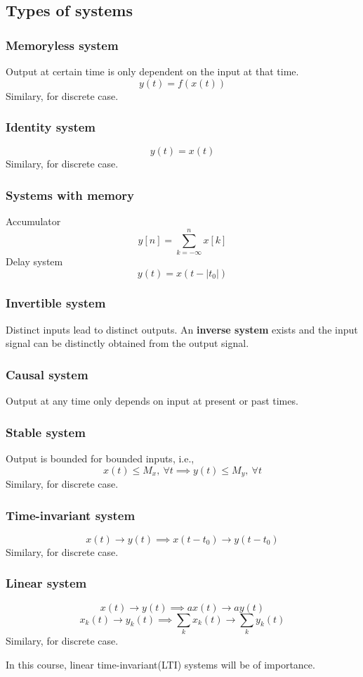 \documentclass[10pt, a4paper]{extarticle}
\theoremstyle{definition}
\begin{document}
\subsection{Types of systems}
\subsubsection{Memoryless system}
Output at certain time is only dependent on the input at that time.
\[y(t)=f(x(t))\]
Similary, for discrete case.
\subsubsection{Identity system}
\[y(t)=x(t)\]
Similary, for discrete case.
\subsubsection{Systems with memory}
Accumulator\[y[n]=\sum_{k=-\infty}^nx[k]\]
Delay system \[y(t)=x(t-|t_0|)\]
\subsubsection{Invertible system}
Distinct inputs lead to distinct outputs. An \textbf{inverse system} exists and the input signal can be distinctly obtained from the output signal.
\subsubsection{Causal system}
Output at any time only depends on input at present or past times.
\subsubsection{Stable system}
Output is bounded for bounded inputs, i.e.,\[x(t)\leq M_x,\ \forall t\implies y(t)\leq M_y,\ \forall t\]
Similary, for discrete case.
\subsubsection{Time-invariant system}
\[x(t)\to y(t)\implies x(t-t_0)\to y(t-t_0)\]
Similary, for discrete case.
\subsubsection{Linear system}
\[x(t)\to y(t)\implies ax(t)\to ay(t)\tag*{(Homogeneity)}\]
\[x_k(t)\to y_k(t)\implies \sum_k x_k(t)\to\sum_k y_k(t)\tag*{(Additivity)}\]
Similary, for discrete case.

In this course, linear time-invariant(LTI) systems will be of importance.
\end{document}
